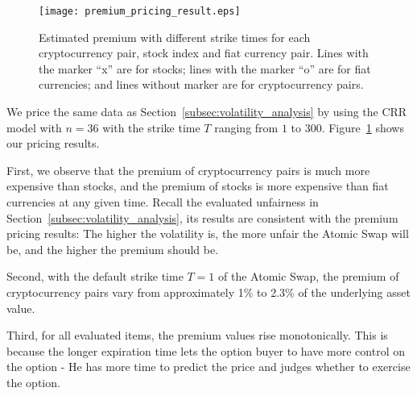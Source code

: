 \begin{figure}
    \texttt{[image: premium\_pricing\_result.eps]}
    \caption{Estimated premium with different strike times for each cryptocurrency pair, stock index and fiat currency pair. Lines with the marker ``x'' are for stocks; lines with the marker ``o'' are for fiat currencies; and lines without marker are for cryptocurrency pairs.}
    \label{fig:premium_pricing_result}
\end{figure}

We price the same data as Section~\ref{subsec:volatility_analysis} by using the CRR model with $n = 36$ with the strike time $T$ ranging from $1$ to $300$.
Figure~\ref{fig:premium_pricing_result} shows our pricing results.

First, we observe that the premium of cryptocurrency pairs is much more expensive than stocks, and the premium of stocks is more expensive than fiat currencies at any given time.
Recall the evaluated unfairness in Section~\ref{subsec:volatility_analysis}, its results are consistent with the premium pricing results: The higher the volatility is, the more unfair the Atomic Swap will be, and the higher the premium should be.

Second, with the default strike time $T = 1$ of the Atomic Swap, the premium of cryptocurrency pairs vary from approximately 1\% to 2.3\% of the underlying asset value.

Third, for all evaluated items, the premium values rise monotonically.
This is because the longer expiration time lets the option buyer to have more control on the option - He has more time to predict the price and judges whether to exercise the option.